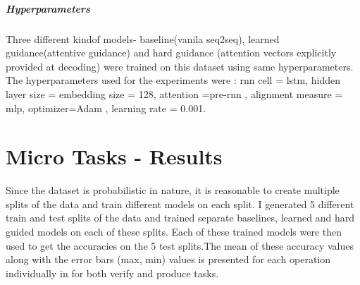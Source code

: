 \subparagraph{Hyperparameters} Three different kindof models- baseline(vanila seq2seq), learned guidance(attentive guidance) and hard guidance (attention vectors explicitly provided at decoding) were trained on this dataset using same hyperparameters. The hyperparameters used for the experiments were : rnn cell = lstm, hidden layer size = embedding size = 128, attention =pre-rnn \citep{Bahdanau2014}, alignment measure = mlp, optimizer=Adam \citep{KingmaB14}, learning rate = 0.001.

\section{Micro Tasks - Results}
Since the dataset is probabilistic in nature, it is reasonable to create multiple splits of the data and train different models on each split. I generated 5 different train and test splits of the data and trained separate baselines, learned and hard guided models on each of these splits. Each of these trained models were then used to get the accuracies on the 5 test splits.The mean of these accuracy values along with the error bars (max, min) values is presented for each operation individually in for both verify and produce tasks.

